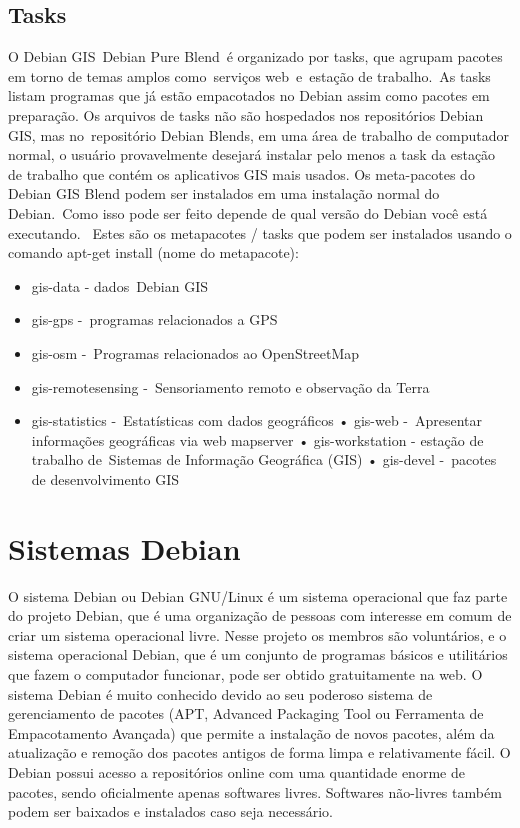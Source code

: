\subsection{Tasks}

O Debian GIS Debian Pure Blend é organizado por tasks, que agrupam pacotes em torno de temas amplos como serviços web e estação de trabalho. As tasks listam programas que já estão empacotados no Debian assim como pacotes em preparação. Os arquivos de tasks não são hospedados nos repositórios Debian GIS, mas no repositório Debian Blends, em uma área de trabalho de computador normal, o usuário provavelmente desejará instalar pelo menos a task da estação de trabalho que contém os aplicativos GIS mais usados. 
Os meta-pacotes do Debian GIS Blend podem ser instalados em uma instalação normal do Debian. Como isso pode ser feito depende de qual versão do Debian você está executando.  
Estes são os metapacotes / tasks que podem ser instalados usando o comando apt-get install (nome do metapacote):
\begin{itemize}
	\item  gis-data - dados Debian GIS
	\item gis-gps - programas relacionados a GPS
	\item gis-osm - Programas relacionados ao OpenStreetMap
	\item gis-remotesensing - Sensoriamento remoto e observação da Terra
	\item gis-statistics - Estatísticas com dados geográficos
• gis-web - Apresentar informações geográficas via web mapserver
• gis-workstation - estação de trabalho de Sistemas de Informação Geográfica (GIS)
• gis-devel - pacotes de desenvolvimento GIS

\end{itemize}
\section{Sistemas Debian}

O sistema Debian ou Debian GNU/Linux é um sistema operacional que faz parte do projeto Debian, que é uma organização de pessoas com interesse em comum de criar um sistema operacional livre. Nesse projeto os membros são voluntários, e o sistema operacional Debian, que é um conjunto de programas básicos e utilitários que fazem o computador funcionar, pode ser obtido gratuitamente na web. O sistema Debian é muito conhecido devido ao seu poderoso sistema de gerenciamento de pacotes (APT, Advanced Packaging Tool ou Ferramenta de Empacotamento Avançada) que permite a instalação de novos pacotes, além da atualização e remoção dos pacotes antigos de forma limpa e relativamente fácil. O Debian possui acesso a repositórios online com uma quantidade enorme de pacotes, sendo oficialmente apenas softwares livres. Softwares não-livres também podem ser baixados e instalados caso seja necessário.


